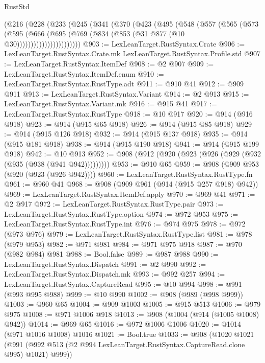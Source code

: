 \begin{lexlean}{RustStd}
\begin{coremodule}
{\begin{coremodule}
{{{{{{{{{{{{{{{{{{{{{{{{{{          (@216
            (@228
              (@233
                (@245
                  (@341
                    (@370
                      (@423
                        (@495
                          (@548
                            (@557
                              (@565
                                (@573
                                  (@595
                                    (@666
                                      (@695
                                        (@769 (@834 (@853 (@31 @877 (@10 @30)))))))))))))))))))))))
@903 := LexLeanTarget.RustSyntax.Crate
@906 := LexLeanTarget.RustSyntax.Crate.mk LexLeanTarget.RustSyntax.Profile.std
@907 := LexLeanTarget.RustSyntax.ItemDef
@908 := @2 @907
@909 := LexLeanTarget.RustSyntax.ItemDef.enum
@910 := LexLeanTarget.RustSyntax.RustType.adt
@911 := @910 @41
@912 := @909 @911
@913 := LexLeanTarget.RustSyntax.Variant
@914 := @2 @913
@915 := LexLeanTarget.RustSyntax.Variant.mk
@916 := @915 @41
@917 := LexLeanTarget.RustSyntax.RustType
@918 := @10 @917
@920 := @914 (@916 @918)
@923 := @914 (@915 @65 @918)
@926 := @914 (@915 @85 @918)
@929 := @914 (@915 @126 @918)
@932 := @914 (@915 @137 @918)
@935 := @914 (@915 @181 @918)
@938 := @914 (@915 @190 @918)
@941 := @914 (@915 @199 @918)
@942 := @10 @913
@952 := @908 (@912 (@920 (@923 (@926 (@929 (@932 (@935 (@938 (@941 @942)))))))))
@953 := @910 @65
@959 := @908 (@909 @953 (@920 (@923 (@926 @942))))
@960 := LexLeanTarget.RustSyntax.RustType.fn
@961 := @960 @41
@968 := @908 (@909 @961 (@914 (@915 @257 @918) @942))
@969 := LexLeanTarget.RustSyntax.ItemDef.apply
@970 := @969 @41
@971 := @2 @917
@972 := LexLeanTarget.RustSyntax.RustType.pair
@973 := LexLeanTarget.RustSyntax.RustType.option
@974 := @972 @953
@975 := LexLeanTarget.RustSyntax.RustType.int
@976 := @974 @975
@978 := @972 (@973 @976)
@979 := LexLeanTarget.RustSyntax.RustType.list
@981 := @978 (@979 @953)
@982 := @971 @981
@984 := @971 @975 @918
@987 := @970 (@982 @984) @981
@988 := Bool.false
@989 := @987 @988
@990 := LexLeanTarget.RustSyntax.Dispatch
@991 := @2 @990
@992 := LexLeanTarget.RustSyntax.Dispatch.mk
@993 := @992 @257
@994 := LexLeanTarget.RustSyntax.CaptureRead
@995 := @10 @994
@998 := @991 (@993 @995 @988)
@999 := @10 @990
@1002 := @908 (@989 (@998 @999))
@1003 := @960 @65
@1004 := @909 @1003
@1005 := @915 @513
@1006 := @979 @975
@1008 := @971 @1006 @918
@1013 := @908 (@1004 (@914 (@1005 @1008) @942))
@1014 := @969 @65
@1016 := @972 @1006 @1006
@1020 := @1014 (@971 @1016 @1008) @1016
@1021 := Bool.true
@1033 := @908
    (@1020
      @1021
      (@991 (@992 @513 (@2 @994 LexLeanTarget.RustSyntax.CaptureRead.clone @995) @1021) @999))
}}}}}}}}}}}}}}}}}}}}}}}}}}
\end{coremodule}}
\end{coremodule}
\end{lexlean}
